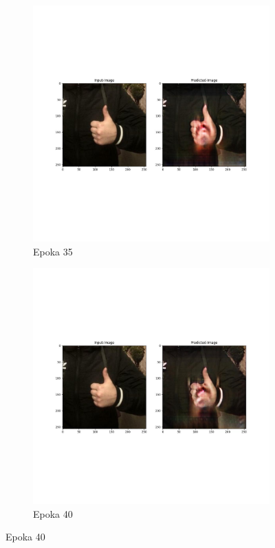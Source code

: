 \documentclass[12pt]{article}
\begin{document}
\begin{sloppypar}
{{\begin{figure}
    \end{figure}
    \begin{figure}
      \begin{subfigure}{.5\textwidth}
        \centering
        \includegraphics[width=.8\linewidth]{cycle-gan/epoch-35.jpg}
        \caption{Epoka 35}
        \label{fig:cg-35}
      \end{subfigure}%
      \begin{subfigure}{.5\textwidth}
        \centering
        \includegraphics[width=.8\linewidth]{cycle-gan/epoch-40.jpg}
        \caption{Epoka 40}
        \label{fig:cg-40}
      \end{subfigure}

\end{figure}}}
\end{sloppypar}
\end{document}
